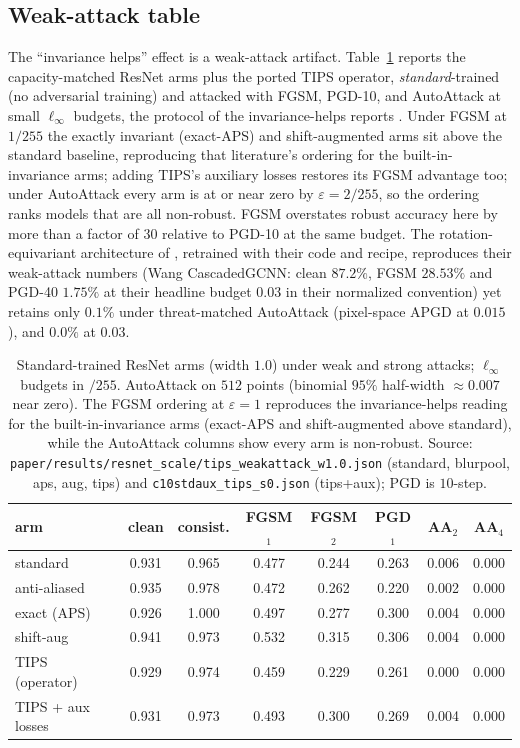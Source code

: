\subsection{Weak-attack table}\label{app:weakattack-full}
The ``invariance helps'' effect is a weak-attack artifact. Table~\ref{tab:weakattack-full}
reports the capacity-matched ResNet arms plus the ported TIPS operator,
\emph{standard}-trained (no adversarial training) and attacked with FGSM, PGD-10,
and AutoAttack at small $\ell_\infty$ budgets, the protocol of the invariance-helps
reports \citep{saha2024improving,wang2025bridging}. Under FGSM at $1/255$ the
exactly invariant (exact-APS) and shift-augmented arms sit above the standard
baseline, reproducing that literature's ordering for the built-in-invariance
arms; adding TIPS's auxiliary losses restores its FGSM advantage too; under
AutoAttack every arm is at or near zero by $\varepsilon=2/255$, so the ordering
ranks models that are all non-robust. FGSM overstates robust accuracy here by more
than a factor of $30$ relative to PGD-10 at the same budget. The rotation-equivariant
architecture of \citet{wang2025bridging}, retrained with their code and recipe,
reproduces their weak-attack numbers (Wang CascadedGCNN: clean $87.2\%$, FGSM
$28.53\%$ and PGD-40 $1.75\%$ at their headline budget $0.03$ in their normalized
convention) yet retains only $0.1\%$ under threat-matched AutoAttack (pixel-space
APGD at $0.015$), and $0.0\%$ at $0.03$.

\begin{table}[t]\centering
\caption{Standard-trained ResNet arms (width $1.0$) under weak and strong attacks;
$\ell_\infty$ budgets in $/255$. AutoAttack on $512$ points (binomial $95\%$
half-width $\approx0.007$ near zero). The FGSM ordering at $\varepsilon{=}1$
reproduces the invariance-helps reading for the built-in-invariance arms
(exact-APS and shift-augmented above standard), while the AutoAttack columns show
every arm is non-robust. Source:
\texttt{paper/results/resnet\_scale/tips\_weakattack\_w1.0.json} (standard,
blurpool, aps, aug, tips) and \texttt{c10stdaux\_tips\_s0.json} (tips+aux);
PGD is $10$-step.}
\label{tab:weakattack-full}
\footnotesize
\begin{tabular}{lcc ccc cc}
\toprule
arm & clean & consist. & FGSM$_1$ & FGSM$_2$ & PGD$_1$ & AA$_2$ & AA$_4$ \\
\midrule
standard          & 0.931 & 0.965 & 0.477 & 0.244 & 0.263 & 0.006 & 0.000 \\
anti-aliased      & 0.935 & 0.978 & 0.472 & 0.262 & 0.220 & 0.002 & 0.000 \\
exact (APS)       & 0.926 & 1.000 & 0.497 & 0.277 & 0.300 & 0.004 & 0.000 \\
shift-aug         & 0.941 & 0.973 & 0.532 & 0.315 & 0.306 & 0.004 & 0.000 \\
TIPS (operator)   & 0.929 & 0.974 & 0.459 & 0.229 & 0.261 & 0.000 & 0.000 \\
TIPS + aux losses & 0.931 & 0.973 & 0.493 & 0.300 & 0.269 & 0.004 & 0.000 \\
\bottomrule
\end{tabular}
\end{table}

